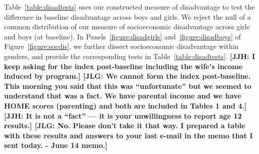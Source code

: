 Table~\ref{table:disadtests} uses our constructed measure of disadvantage to test the difference in baseline disadvantage across boys and girls. We reject the null of a common distribution of our measure of socioeconomic disadvantage across girls and boys (at baseline). In Panels~\ref{figure:disadgirls} and~\ref{figure:disadboys} of Figure~\ref{figure:socdis}, we further dissect socioeconomic disadvantage within genders, and provide the corresponding tests in Table~\ref{table:disadtests}. \textbf{[JJH: I keep asking for the index post-baseline including the wife's income induced by program.] [JLG: We cannot form the index post-baseline. This morning you said that this was ``unfortunate'' but we seemed to understand that was a fact. We have parental income and we have HOME scores (parenting) and both are included in Tables 1 and 4.] [JJH: It is not a ``fact'' --- it is your unwillingness to report age 12 results.] [JLG: No. Please don't take it that way. I prepared a table with these results and answers to your last e-mail in the memo that I sent today. - June 14 memo.]}

